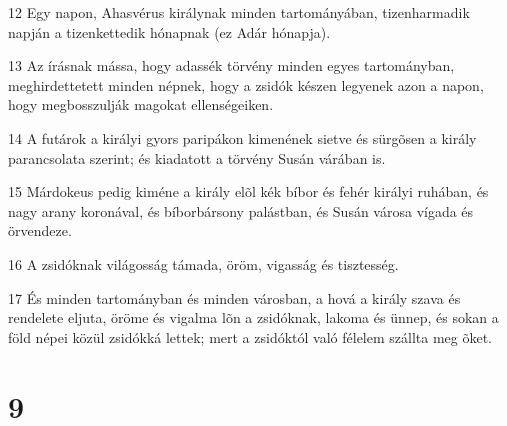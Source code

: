 \par 12 Egy napon, Ahasvérus királynak minden tartományában, tizenharmadik napján a tizenkettedik hónapnak (ez Adár hónapja).
\par 13 Az írásnak mássa, hogy adassék törvény minden egyes tartományban, meghirdettetett minden népnek, hogy a zsidók készen legyenek azon a napon, hogy megbosszulják magokat ellenségeiken.
\par 14 A futárok a királyi gyors paripákon kimenének sietve és sürgõsen a király parancsolata szerint; és kiadatott a törvény Susán várában is.
\par 15 Márdokeus pedig kiméne a király elõl kék bíbor és fehér királyi ruhában, és nagy arany koronával, és bíborbársony palástban, és Susán városa vígada és örvendeze.
\par 16 A zsidóknak világosság támada, öröm, vigasság és tisztesség.
\par 17 És minden tartományban és minden városban, a hová a király szava és rendelete eljuta, öröme és vigalma lõn a zsidóknak, lakoma és ünnep, és sokan a föld népei közül zsidókká lettek; mert a zsidóktól való  félelem szállta meg õket.

\chapter{9}

